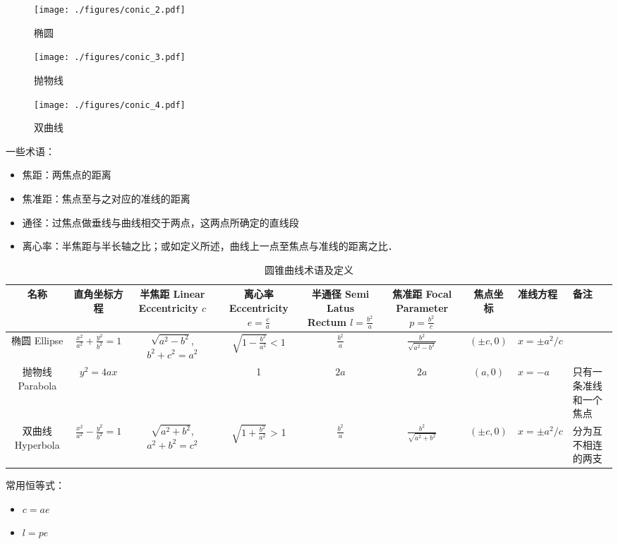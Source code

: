 \begin{figure}[ht]
\centering
\texttt{[image: ./figures/conic\_2.pdf]}
\caption{椭圆} \label{conic_fig2}
\end{figure}

\begin{figure}[ht]
\centering
\texttt{[image: ./figures/conic\_3.pdf]}
\caption{抛物线} \label{conic_fig3}
\end{figure}

\begin{figure}[ht]
\centering
\texttt{[image: ./figures/conic\_4.pdf]}
\caption{双曲线} \label{conic_fig4}
\end{figure}

一些术语：
\begin{itemize}
\item 焦距：两焦点的距离
\item 焦准距：焦点至与之对应的准线的距离
\item 通径：过焦点做垂线与曲线相交于两点，这两点所确定的直线段
\item 离心率：半焦距与半长轴之比；或如定义所述，曲线上一点至焦点与准线的距离之比．
\end{itemize}

\begin{table}[ht]
\centering
\caption{圆锥曲线术语及定义}\label{conic_tab1}
\begin{tabular}{|c|c|c|c|c|c|c|}
\hline
名称 & 直角坐标方程 & 半焦距 Linear Eccentricity $c$ & 离心率 Eccentricity $e = \frac{c}{a}$ & 半通径 Semi Latus Rectum $l=\frac{b^2}{a}$ & 焦准距 Focal Parameter$p=\frac{b^2}{c}$ & 焦点坐标&准线方程 &备注\\
\hline
椭圆 Ellipse & $\frac{x^2}{a^2} + \frac{y^2}{b^2} = 1$ & $\sqrt{a^2-b^2}$, $b^2+c^2=a^2$ & $\sqrt{1-\frac{b^2}{a^2}} < 1$ & $\frac{b^2}{a}$ & $\frac{b^2}{\sqrt{a^2-b^2}}$ & $(\pm c,0)$ & $x=\pm a^2/c$& \\
\hline
抛物线 Parabola & $y^2=4ax$ & \ & 1 & $2a$ & $2a$ & $(a,0)$ & $x=-a$ & 只有一条准线和一个焦点\\
\hline
双曲线 Hyperbola & $\frac{x^2}{a^2} - \frac{y^2}{b^2} = 1$ & $\sqrt{a^2+b^2}$,$a^2+b^2=c^2$ & $\sqrt{1+\frac{b^2}{a^2}}$ > 1 & $\frac{b^2}{a}$ & $\frac{b^2}{\sqrt{a^2+b^2}}$ & $(\pm c,0)$ & $x=\pm a^2/c$ & 分为互不相连的两支 \\
\hline
\end{tabular}
\end{table}

常用恒等式：
\begin{itemize}
\item $c=ae$
\item $l=pe$
\end{itemize}
